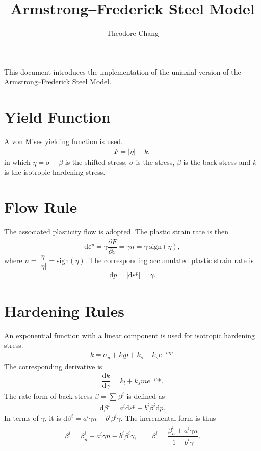 \documentclass[a4paper,10pt,fleqn]{article}
\title{Armstrong--Frederick Steel Model}
\author{Theodore Chang}
\date{}\pagestyle{empty}
\newcommand*{\md}[1]{\mathrm{d}#1}
\newcommand*{\sign}[1]{\mathrm{sign}\left(#1\right)}
\newcommand*{\pfrac}[2]{\dfrac{\partial#1}{\partial#2}}
\newcommand*{\ddfrac}[2]{\dfrac{\md#1}{\md#2}}
\begin{document}
\noindent{}This document introduces the implementation of the uniaxial version of the Armstrong--Frederick Steel Model.
\section{Yield Function}
A von Mises yielding function is used.
\begin{gather}
F=\Big|\eta\Big|-k,
\end{gather}
in which $\eta=\sigma-\beta$ is the shifted stress, $\sigma$ is the stress, $\beta$ is the back stress and $k$ is the isotropic hardening stress.
\section{Flow Rule}
The associated plasticity flow is adopted. The plastic strain rate is then
\begin{gather}
\md{\varepsilon^p}=\gamma\pfrac{F}{\sigma}=\gamma{}n=\gamma~\sign{\eta},
\end{gather}
where $n=\dfrac{\eta}{\Big|\eta\Big|}=\sign{\eta}$. The corresponding accumulated plastic strain rate is
\begin{gather}
\md{p}=\Big|\md{\varepsilon^p}\Big|=\gamma.
\end{gather}
\section{Hardening Rules}
An exponential function with a linear component is used for isotropic hardening stress.
\begin{gather}
k=\sigma_y+k_lp+k_s-k_se^{-mp}.
\end{gather}
The corresponding derivative is
\begin{gather}
\ddfrac{k}{\gamma}=k_l+k_sme^{-mp}.
\end{gather}
The rate form of back stress $\displaystyle\beta=\sum\beta^i$ is defined as
\begin{gather*}
\md{\beta^i}=a^i\md{\varepsilon^p}-b^i\beta^i\md{p}.
\end{gather*}
In terms of $\gamma$, it is $\md{\beta^i}=a^i\gamma{}n-b^i\beta^i\gamma$. The incremental form is thus
\begin{gather}
\beta^i=\beta_n^i+a^i\gamma{}n-b^i\beta^i\gamma,\qquad
\beta^i=\dfrac{\beta_n^i+a^i\gamma{}n}{1+b^i\gamma}.
\end{gather}
\end{document}
